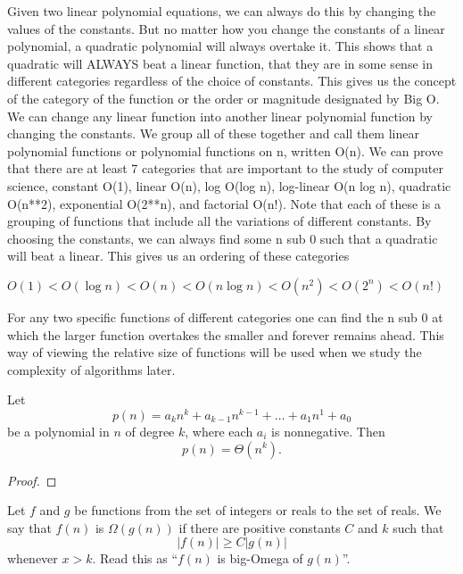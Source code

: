 Given two linear polynomial equations, we can always do this by changing the values of the constants. But no matter how you change the constants of a linear polynomial, a quadratic polynomial will always overtake it. This shows that a quadratic will ALWAYS beat a linear function, that they are in some sense in different categories regardless of the choice of constants. This gives us the concept of the category of the function or the order or magnitude designated by Big O. We can change any linear function into another linear polynomial function by changing the constants. We group all of these together and call them linear polynomial functions or polynomial functions on n, written O(n). We can prove that there are at least 7 categories that are important to the study of computer science, constant O(1), linear O(n), log O(log n), log-linear O(n log n), quadratic O(n**2), exponential O(2**n), and factorial O(n!). Note that each of these is a grouping of functions that include all the variations of different constants. By choosing the constants, we can always find some n sub 0 such that a quadratic will beat a linear. This gives us an ordering of these categories

$O(1) < O(\log n) < O(n) < O(n \log n) < O(n^2) < O(2^n) < O(n!)$

For any two specific functions of different categories one can find the n sub 0 at which the larger function overtakes the smaller and forever remains ahead. This way of viewing the relative size of functions will be used when we study the complexity of algorithms later.

\begin{theorem}
Let 
\begin{displaymath}
p(n)=a_kn^k+a_{k-1}n^{k-1}+\ldots +a_1n^1+a_0
\end{displaymath}
be a polynomial in $n$ of degree $k$, where each $a_i$ is nonnegative. Then
\begin{displaymath}
p(n)=\Theta(n^k).
\end{displaymath}
\begin{proof}

\end{proof}
\end{theorem} 


\begin{definition}
Let $f$ and $g$ be functions from the set of integers or reals to the set of reals. We say that $f(n)$ is $\Omega(g(n))$ if there are positive constants $C$ and $k$ such that 
\begin{displaymath}
\lvert f(n)\rvert \ge C\lvert g(n)\rvert
\end{displaymath}
whenever $x>k$. Read this as ``$f(n)$ is big-Omega of $g(n)$''.
\end{definition}

\begin{definition}

\end{definition}

\newpage
